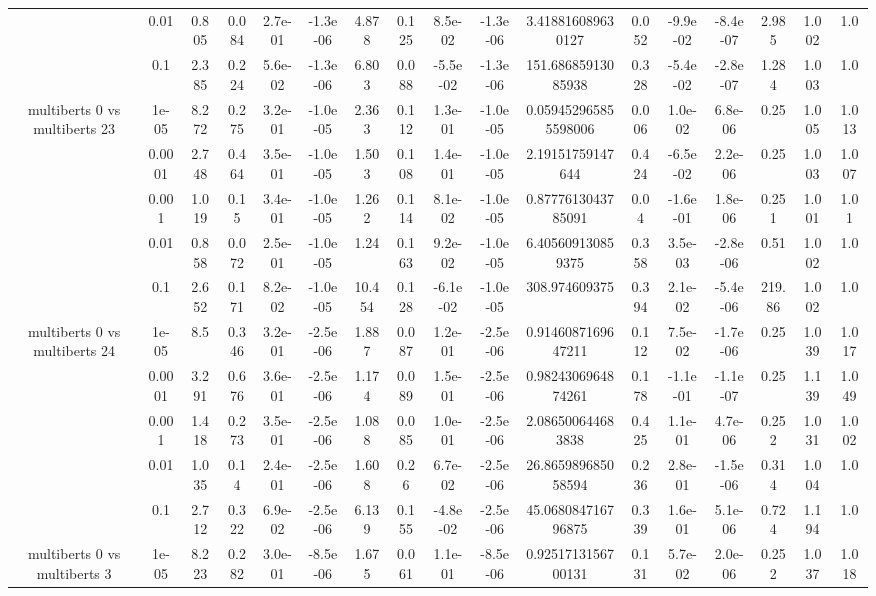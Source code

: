 \begin{tabular}{|c|c|c|c|c|c|c|c|c|c|c|c|c|c|c|c|c|}
 & 0.01 & 0.805 & 0.084 & 2.7e-01 & -1.3e-06 & 4.878 & 0.125 & 8.5e-02 & -1.3e-06 & 3.418816089630127 & 0.052 & -9.9e-02 & -8.4e-07 & 2.985 & 1.002 & 1.0 \\
 & 0.1 & 2.385 & 0.224 & 5.6e-02 & -1.3e-06 & 6.803 & 0.088 & -5.5e-02 & -1.3e-06 & 151.68685913085938 & 0.328 & -5.4e-02 & -2.8e-07 & 1.284 & 1.003 & 1.0 \\
\hline
\multirow{5}{*}{multiberts 0 vs multiberts 23} & 1e-05 & 8.272 & 0.275 & 3.2e-01 & -1.0e-05 & 2.363 & 0.112 & 1.3e-01 & -1.0e-05 & 0.059452965855598006 & 0.006 & 1.0e-02 & 6.8e-06 & 0.25 & 1.005 & 1.013 \\
 & 0.0001 & 2.748 & 0.464 & 3.5e-01 & -1.0e-05 & 1.503 & 0.108 & 1.4e-01 & -1.0e-05 & 2.19151759147644 & 0.424 & -6.5e-02 & 2.2e-06 & 0.25 & 1.003 & 1.007 \\
 & 0.001 & 1.019 & 0.15 & 3.4e-01 & -1.0e-05 & 1.262 & 0.114 & 8.1e-02 & -1.0e-05 & 0.8777613043785091 & 0.04 & -1.6e-01 & 1.8e-06 & 0.251 & 1.001 & 1.01 \\
 & 0.01 & 0.858 & 0.072 & 2.5e-01 & -1.0e-05 & 1.24 & 0.163 & 9.2e-02 & -1.0e-05 & 6.405609130859375 & 0.358 & 3.5e-03 & -2.8e-06 & 0.51 & 1.002 & 1.0 \\
 & 0.1 & 2.652 & 0.171 & 8.2e-02 & -1.0e-05 & 10.454 & 0.128 & -6.1e-02 & -1.0e-05 & 308.974609375 & 0.394 & 2.1e-02 & -5.4e-06 & 219.86 & 1.002 & 1.0 \\
\hline
\multirow{5}{*}{multiberts 0 vs multiberts 24} & 1e-05 & 8.5 & 0.346 & 3.2e-01 & -2.5e-06 & 1.887 & 0.087 & 1.2e-01 & -2.5e-06 & 0.9146087169647211 & 0.112 & 7.5e-02 & -1.7e-06 & 0.25 & 1.039 & 1.017 \\
 & 0.0001 & 3.291 & 0.676 & 3.6e-01 & -2.5e-06 & 1.174 & 0.089 & 1.5e-01 & -2.5e-06 & 0.9824306964874261 & 0.178 & -1.1e-01 & -1.1e-07 & 0.25 & 1.139 & 1.049 \\
 & 0.001 & 1.418 & 0.273 & 3.5e-01 & -2.5e-06 & 1.088 & 0.085 & 1.0e-01 & -2.5e-06 & 2.086500644683838 & 0.425 & 1.1e-01 & 4.7e-06 & 0.252 & 1.031 & 1.002 \\
 & 0.01 & 1.035 & 0.14 & 2.4e-01 & -2.5e-06 & 1.608 & 0.26 & 6.7e-02 & -2.5e-06 & 26.865989685058594 & 0.236 & 2.8e-01 & -1.5e-06 & 0.314 & 1.004 & 1.0 \\
 & 0.1 & 2.712 & 0.322 & 6.9e-02 & -2.5e-06 & 6.139 & 0.155 & -4.8e-02 & -2.5e-06 & 45.068084716796875 & 0.339 & 1.6e-01 & 5.1e-06 & 0.724 & 1.194 & 1.0 \\
\hline
\multirow{5}{*}{multiberts 0 vs multiberts 3} & 1e-05 & 8.223 & 0.282 & 3.0e-01 & -8.5e-06 & 1.675 & 0.061 & 1.1e-01 & -8.5e-06 & 0.9251713156700131 & 0.131 & 5.7e-02 & 2.0e-06 & 0.252 & 1.037 & 1.018 \\

\end{tabular}
